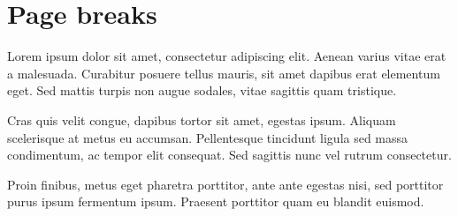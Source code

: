 \documentclass{article}
\begin{document}
\section*{Page breaks}

\noindent Lorem ipsum dolor sit amet, consectetur adipiscing elit. Aenean varius
vitae erat a malesuada. Curabitur posuere tellus mauris, sit amet dapibus erat
elementum eget. Sed mattis turpis non augue sodales, vitae sagittis quam
tristique.

\newpage

\noindent Cras quis velit congue, dapibus tortor sit amet, egestas ipsum.
Aliquam scelerisque at metus eu accumsan. Pellentesque tincidunt ligula sed
massa condimentum, ac tempor elit consequat. Sed sagittis nunc vel rutrum
consectetur.

\newpage

\noindent Proin finibus, metus eget pharetra porttitor, ante ante egestas
nisi, sed porttitor purus ipsum fermentum ipsum. Praesent porttitor quam eu
blandit euismod.
\end{document}
